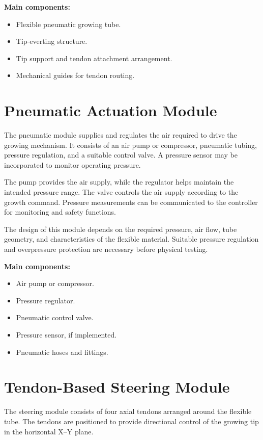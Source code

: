 \textbf{Main components:}
\begin{itemize}
    \item Flexible pneumatic growing tube.
    \item Tip-everting structure.
    \item Tip support and tendon attachment arrangement.
    \item Mechanical guides for tendon routing.
\end{itemize}

\section{Pneumatic Actuation Module}

The pneumatic module supplies and regulates the air required to drive the growing mechanism. It consists of an air pump or compressor, pneumatic tubing, pressure regulation, and a suitable control valve. A pressure sensor may be incorporated to monitor operating pressure.

The pump provides the air supply, while the regulator helps maintain the intended pressure range. The valve controls the air supply according to the growth command. Pressure measurements can be communicated to the controller for monitoring and safety functions.

The design of this module depends on the required pressure, air flow, tube geometry, and characteristics of the flexible material. Suitable pressure regulation and overpressure protection are necessary before physical testing.

\textbf{Main components:}
\begin{itemize}
    \item Air pump or compressor.
    \item Pressure regulator.
    \item Pneumatic control valve.
    \item Pressure sensor, if implemented.
    \item Pneumatic hoses and fittings.
\end{itemize}

\section{Tendon-Based Steering Module}

The steering module consists of four axial tendons arranged around the flexible tube. The tendons are positioned to provide directional control of the growing tip in the horizontal X--Y plane.

